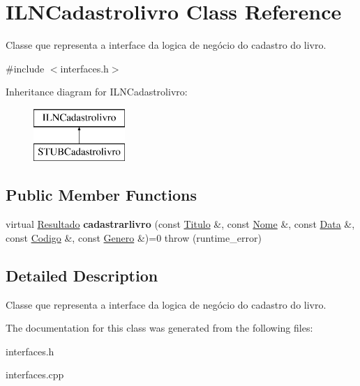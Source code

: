 \hypertarget{classILNCadastrolivro}{}\section{I\+L\+N\+Cadastrolivro Class Reference}
\label{classILNCadastrolivro}


Classe que representa a interface da logica de negócio do cadastro do livro.  




{\ttfamily \#include $<$interfaces.\+h$>$}

Inheritance diagram for I\+L\+N\+Cadastrolivro\+:\begin{figure}[H]
\begin{center}
\leavevmode
\includegraphics[height=2.000000cm]{classILNCadastrolivro}
\end{center}
\end{figure}
\subsection*{Public Member Functions}
\begin{DoxyCompactItemize}
\item 
\mbox{\label{classILNCadastrolivro_a565d8092e061b396f9aa3b8fb66a662e}} 
virtual \hyperlink{classResultado}{Resultado} {\bfseries cadastrarlivro} (const \hyperlink{classTitulo}{Titulo} \&, const \hyperlink{classNome}{Nome} \&, const \hyperlink{classData}{Data} \&, const \hyperlink{classCodigo}{Codigo} \&, const \hyperlink{classGenero}{Genero} \&)=0  throw (runtime\+\_\+error)
\end{DoxyCompactItemize}


\subsection{Detailed Description}
Classe que representa a interface da logica de negócio do cadastro do livro. 

The documentation for this class was generated from the following files\+:\begin{DoxyCompactItemize}
\item 
interfaces.\+h\item 
interfaces.\+cpp\end{DoxyCompactItemize}
